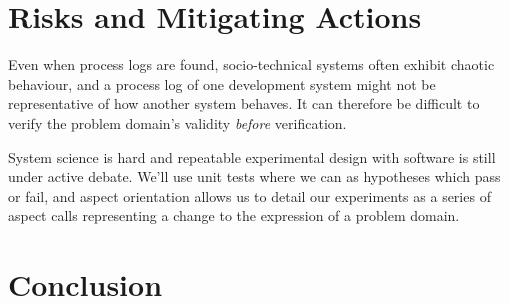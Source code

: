 \documentclass[draft]{article}
\begin{document}
\section{Risks and Mitigating Actions}
\label{sec:risks}


Even when process logs are found, socio-technical systems often exhibit chaotic
behaviour, and a process log of one development system might not be
representative of how another system behaves. It can therefore be difficult to
verify the problem domain's validity \emph{before} verification.

System science is hard and repeatable experimental design with software is still
under active debate. We'll use unit tests where we can as hypotheses which pass
or fail, and aspect orientation allows us to detail our experiments as a series
of aspect calls representing a change to the expression of a problem domain. 


\section{Conclusion}
\label{sec:concluion}















\end{document}
